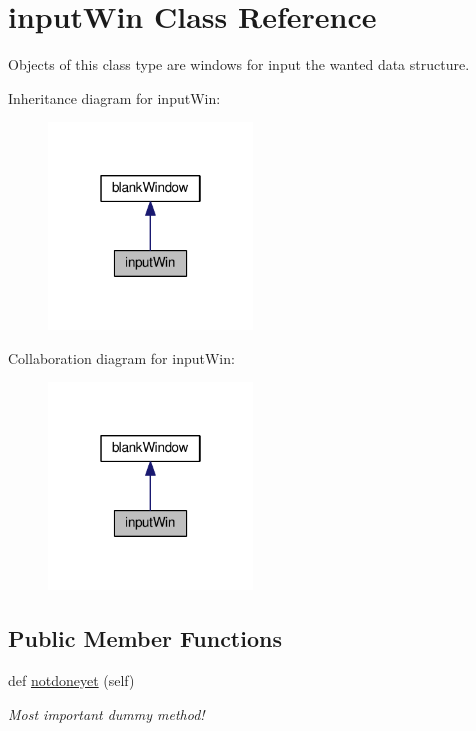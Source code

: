 \hypertarget{classgui_1_1window_1_1inputWin}{}\section{input\+Win Class Reference}
\label{classgui_1_1window_1_1inputWin}


Objects of this class type are windows for input the wanted data structure.  




Inheritance diagram for input\+Win\+:
\nopagebreak
\begin{figure}[H]
\begin{center}
\leavevmode
\includegraphics[width=154pt]{classgui_1_1window_1_1inputWin__inherit__graph}
\end{center}
\end{figure}


Collaboration diagram for input\+Win\+:
\nopagebreak
\begin{figure}[H]
\begin{center}
\leavevmode
\includegraphics[width=154pt]{classgui_1_1window_1_1inputWin__coll__graph}
\end{center}
\end{figure}
\subsection*{Public Member Functions}
\begin{DoxyCompactItemize}
\item 
def \hyperlink{classgui_1_1window_1_1inputWin_a2d865a6aea10146f28c546bed4ae1f44}{notdoneyet} (self)\hypertarget{classgui_1_1window_1_1inputWin_a2d865a6aea10146f28c546bed4ae1f44}{}\label{classgui_1_1window_1_1inputWin_a2d865a6aea10146f28c546bed4ae1f44}

\begin{DoxyCompactList}\small\item\em Most important dummy method! \end{DoxyCompactList}\end{DoxyCompactItemize}



